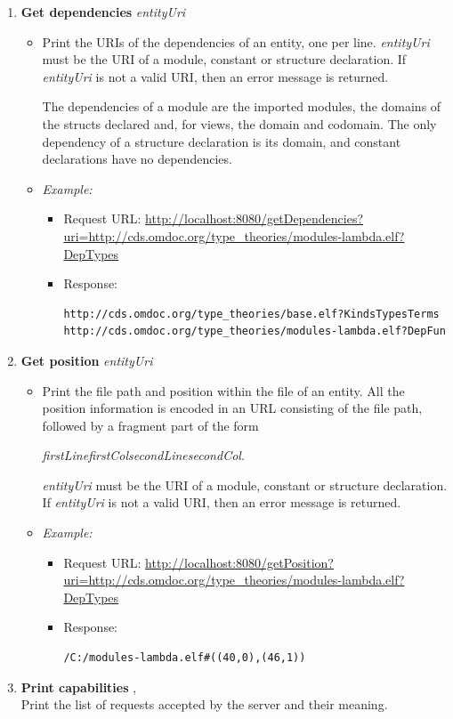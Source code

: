 \begin{enumerate}
\item \textbf{Get dependencies} \qquad  {}\textit{entityUri}
	\begin{itemize}
	\item Print the URIs of the dependencies of an entity, one per line. \textit{entityUri} must be the URI of a module, constant or structure declaration. If \textit{entityUri} is not a valid URI, then an error message is returned.

The dependencies of a module are the imported modules, the domains of the structs declared and, for views, the domain and codomain. The only dependency of a structure declaration is its domain, and constant declarations have no dependencies.
	\item \textit{Example:} 
		\begin{itemize}
		\item Request URL:  \url{http://localhost:8080/getDependencies?uri=http://cds.omdoc.org/type\_theories/modules-lambda.elf?DepTypes}
		\item Response: 
		\begin{verbatim}http://cds.omdoc.org/type_theories/base.elf?KindsTypesTerms
http://cds.omdoc.org/type_theories/modules-lambda.elf?DepFun\end{verbatim}
		\end{itemize}
	\end{itemize}



\item \textbf{Get position} \qquad  {}\textit{entityUri}
	\begin{itemize}
	\item Print the file path and position within the file of an entity. All the position information is encoded in an URL consisting of the file path, followed by a fragment part of the form
\begin{center} \ttt{\#((}\textit{firstLine}\ttt{,}\textit{firstCol}\ttt{),(}\textit{secondLine}\ttt{,}\textit{secondCol}\ttt{))}. \end{center} \textit{entityUri} must be the URI of a module, constant or structure declaration. If \textit{entityUri} is not a valid URI, then an error message is returned.
	\item \textit{Example:} 
		\begin{itemize}
		\item Request URL:  \url{http://localhost:8080/getPosition?uri=http://cds.omdoc.org/type\_theories/modules-lambda.elf?DepTypes}
		\item Response: 
		\begin{verbatim}/C:/modules-lambda.elf#((40,0),(46,1))\end{verbatim}
		\end{itemize}
	\end{itemize}

\item \textbf{Print capabilities} \qquad  \ttt{/}, \  \\
	Print the list of requests accepted by the server and their meaning.
\end{enumerate}


